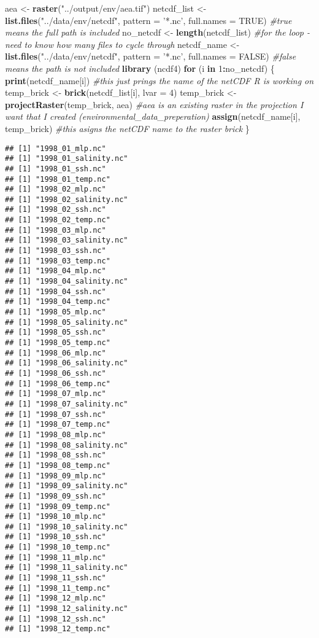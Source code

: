 \documentclass[]{article}
\newenvironment{Shaded}{\begin{snugshade}}{\end{snugshade}}
\newcommand{\KeywordTok}[1]{\textcolor[rgb]{0.13,0.29,0.53}{\textbf{#1}}}
\newcommand{\DataTypeTok}[1]{\textcolor[rgb]{0.13,0.29,0.53}{#1}}
\newcommand{\DecValTok}[1]{\textcolor[rgb]{0.00,0.00,0.81}{#1}}
\newcommand{\StringTok}[1]{\textcolor[rgb]{0.31,0.60,0.02}{#1}}
\newcommand{\CommentTok}[1]{\textcolor[rgb]{0.56,0.35,0.01}{\textit{#1}}}
\newcommand{\OtherTok}[1]{\textcolor[rgb]{0.56,0.35,0.01}{#1}}
\newcommand{\ControlFlowTok}[1]{\textcolor[rgb]{0.13,0.29,0.53}{\textbf{#1}}}
\newcommand{\OperatorTok}[1]{\textcolor[rgb]{0.81,0.36,0.00}{\textbf{#1}}}
\newcommand{\NormalTok}[1]{#1}
\begin{document}
\begin{Shaded}
\begin{Highlighting}[]
\NormalTok{aea <-}\StringTok{ }\KeywordTok{raster}\NormalTok{(}\StringTok{"../output/env/aea.tif"}\NormalTok{)}
\NormalTok{netcdf_list <-}\StringTok{ }\KeywordTok{list.files}\NormalTok{(}\StringTok{"../data/env/netcdf"}\NormalTok{, }\DataTypeTok{pattern =} \StringTok{'*.nc'}\NormalTok{, }\DataTypeTok{full.names =} \OtherTok{TRUE}\NormalTok{) }\CommentTok{#true means the full path is included}
\NormalTok{no_netcdf <-}\StringTok{ }\KeywordTok{length}\NormalTok{(netcdf_list) }\CommentTok{#for the loop - need to know how many files to cycle through}
\NormalTok{netcdf_name <-}\StringTok{ }\KeywordTok{list.files}\NormalTok{(}\StringTok{"../data/env/netcdf"}\NormalTok{, }\DataTypeTok{pattern =} \StringTok{'*.nc'}\NormalTok{, }\DataTypeTok{full.names =} \OtherTok{FALSE}\NormalTok{) }\CommentTok{#false means the path is not included}
\KeywordTok{library}\NormalTok{ (ncdf4)}
\ControlFlowTok{for}\NormalTok{ (i }\ControlFlowTok{in} \DecValTok{1}\OperatorTok{:}\NormalTok{no_netcdf) \{}
  \KeywordTok{print}\NormalTok{(netcdf_name[i]) }\CommentTok{#this just prings the name of the netCDF R is working on}
\NormalTok{  temp_brick <-}\StringTok{ }\KeywordTok{brick}\NormalTok{(netcdf_list[i], }\DataTypeTok{lvar =} \DecValTok{4}\NormalTok{)}
\NormalTok{  temp_brick <-}\StringTok{ }\KeywordTok{projectRaster}\NormalTok{(temp_brick, aea) }\CommentTok{#aea is an existing raster in the projection I want that I created (environmental_data_preperation)}
  \KeywordTok{assign}\NormalTok{(netcdf_name[i], temp_brick) }\CommentTok{#this asigns the netCDF name to the raster brick}
\NormalTok{\}}
\end{Highlighting}
\end{Shaded}

\begin{verbatim}
## [1] "1998_01_mlp.nc"
## [1] "1998_01_salinity.nc"
## [1] "1998_01_ssh.nc"
## [1] "1998_01_temp.nc"
## [1] "1998_02_mlp.nc"
## [1] "1998_02_salinity.nc"
## [1] "1998_02_ssh.nc"
## [1] "1998_02_temp.nc"
## [1] "1998_03_mlp.nc"
## [1] "1998_03_salinity.nc"
## [1] "1998_03_ssh.nc"
## [1] "1998_03_temp.nc"
## [1] "1998_04_mlp.nc"
## [1] "1998_04_salinity.nc"
## [1] "1998_04_ssh.nc"
## [1] "1998_04_temp.nc"
## [1] "1998_05_mlp.nc"
## [1] "1998_05_salinity.nc"
## [1] "1998_05_ssh.nc"
## [1] "1998_05_temp.nc"
## [1] "1998_06_mlp.nc"
## [1] "1998_06_salinity.nc"
## [1] "1998_06_ssh.nc"
## [1] "1998_06_temp.nc"
## [1] "1998_07_mlp.nc"
## [1] "1998_07_salinity.nc"
## [1] "1998_07_ssh.nc"
## [1] "1998_07_temp.nc"
## [1] "1998_08_mlp.nc"
## [1] "1998_08_salinity.nc"
## [1] "1998_08_ssh.nc"
## [1] "1998_08_temp.nc"
## [1] "1998_09_mlp.nc"
## [1] "1998_09_salinity.nc"
## [1] "1998_09_ssh.nc"
## [1] "1998_09_temp.nc"
## [1] "1998_10_mlp.nc"
## [1] "1998_10_salinity.nc"
## [1] "1998_10_ssh.nc"
## [1] "1998_10_temp.nc"
## [1] "1998_11_mlp.nc"
## [1] "1998_11_salinity.nc"
## [1] "1998_11_ssh.nc"
## [1] "1998_11_temp.nc"
## [1] "1998_12_mlp.nc"
## [1] "1998_12_salinity.nc"
## [1] "1998_12_ssh.nc"
## [1] "1998_12_temp.nc"
\end{verbatim}
\end{document}
